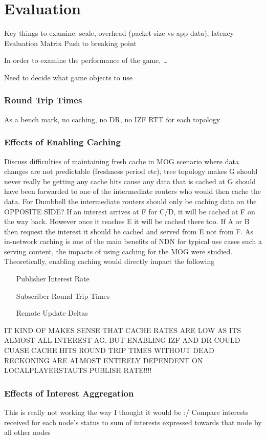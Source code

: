 \chapter{Evaluation}\label{eval}
Key things to examine: scale, overhead (packet size vs app data), latency
Evaluation Matrix
Push to breaking point

In order to examine the performance of the game, \dots

Need to decide what game objects to use

\subsection{Round Trip Times}
As a bench mark, no caching, no DR, no IZF RTT for each topology

\subsection{Effects of Enabling Caching}
Discuss difficulties of maintaining fresh cache in MOG scenario where data changes are not predictable (freshness period etc), tree topology makes G should never really be getting any cache hits cause any data that is cached at G should have been forwarded to one of the intermediate routers who would then cache the data. For Dumbbell the intermediate routers should only be caching data on the OPPOSITE SIDE? If an interest arrives at F for C/D, it will be cached at F on the way back. However once it reaches E it will be cached there too. If A or B  then request the interest it should be cached and served from E not from F. 
As in-network caching is one of the main benefits of NDN for typical use cases such a serving content, the impacts of using caching for the MOG were studied. Theoretically, enabling caching would directly impact the following


\begin{itemize}
    \item[Publisher Interest Rate]
    \item[Subscriber Round Trip Times]
    \item[Remote Update Deltas]  
\end{itemize}

IT KIND OF MAKES SENSE THAT CACHE RATES ARE LOW AS ITS ALMOST ALL INTEREST AG. BUT ENABLING IZF AND DR COULD CUASE CACHE HITS 
ROUND TRIP TIMES WITHOUT DEAD RECKONING ARE ALMOST ENTIRELY DEPENDENT ON LOCALPLAYERSTAUTS PUBLISH RATE!!!!
\subsection{Effects of Interest Aggregation}
This is really not working the way I thought it would be :/
Compare interests received for each node's status to sum of interests expressed towards that node by all other nodes



